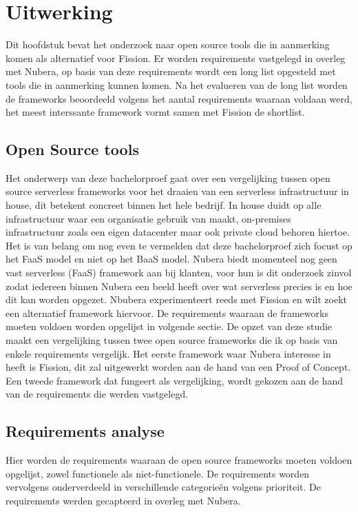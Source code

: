 \chapter{Uitwerking}
\label{ch:uitwerking}

Dit hoofdstuk bevat het onderzoek naar open source tools die in aanmerking komen als alternatief voor Fission. Er worden requirements vastgelegd in overleg met Nubera, op basis van deze requirements wordt een long list opgesteld met tools die in aanmerking kunnen komen. Na het evalueren van de long list worden de frameworks beoordeeld volgens het aantal requirements waaraan voldaan werd, het meest interssante framework vormt samen met Fission de shortlist.

\section{Open Source tools}
Het onderwerp van deze bachelorproef gaat over een vergelijking tussen open source serverless frameworks voor het draaien van een serverless infrastructuur in house, dit betekent concreet binnen het hele bedrijf. In house duidt op alle infrastructuur waar een organisatie gebruik van maakt, on-premises infrastructuur zoals een eigen datacenter maar ook private cloud behoren hiertoe. Het is van belang om nog even te vermelden dat deze bachelorproef zich focust op het FaaS model en niet op het BaaS model. Nubera biedt momenteel nog geen vast serverless (FaaS) framework aan bij klanten, voor hun is dit onderzoek zinvol zodat iedereen binnen Nubera een beeld heeft over wat serverless precies is en hoe dit kan worden opgezet. Nbubera experimenteert reeds met Fission en wilt zoekt een alternatief framework hiervoor. De requirements waaraan de frameworks moeten voldoen worden opgelijst in volgende sectie. De opzet van deze studie maakt een vergelijking tussen twee open source frameworks die ik op basis van enkele requirements vergelijk. Het eerste framework waar Nubera interesse in heeft is Fission, dit zal uitgewerkt worden aan de hand van een Proof of Concept. Een tweede framework dat fungeert als vergelijking, wordt gekozen aan de hand van de requirements die werden vastgelegd.

\section{Requirements analyse}
Hier worden de requirements waaraan de open source frameworks moeten voldoen opgelijst, zowel functionele als niet-functionele. De requirements worden vervolgens onderverdeeld in verschillende categorieën volgens prioriteit. De requirements werden gecapteerd in overleg met Nubera.

